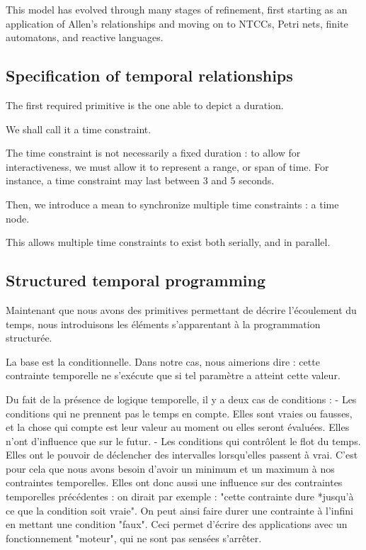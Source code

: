 \documentclass{sigchi}
\begin{document}
This model has evolved through many stages of refinement, first starting as an application of 
Allen's relationships and moving on to NTCCs, Petri nets, finite automatons, and reactive languages.

\subsection{Specification of temporal relationships}\label{sec.temporal}
The first required primitive is the one able to depict a duration.

We shall call it a time constraint.

The time constraint is not necessarily a fixed duration : to allow for interactiveness, 
we must allow it to represent a range, or span of time. For instance, a time constraint may last between 3 and 5 seconds.

Then, we introduce a mean to synchronize multiple time constraints : a time node. 

This allows multiple time constraints to exist both serially, and in parallel. 


\subsection{Structured temporal programming}
Maintenant que nous avons des primitives permettant de décrire l'écoulement du temps, nous introduisons les éléments s'apparentant à la programmation structurée.

La base est la conditionnelle. Dans notre cas, nous aimerions dire : cette contrainte temporelle ne s'exécute que si tel paramètre a atteint cette valeur.

Du fait de la présence de logique temporelle, il y a deux cas de conditions : 
- Les conditions qui ne prennent pas le temps en compte. Elles sont vraies ou fausses, et la chose qui compte est leur valeur au moment ou elles seront évaluées. Elles n'ont d'influence que sur le futur.
- Les conditions qui contrôlent le flot du temps. Elles ont le pouvoir de déclencher des intervalles lorsqu'elles passent à vrai. C'est pour cela que nous avons besoin d'avoir un minimum et un maximum à nos contraintes temporelles. Elles ont donc aussi une influence sur des contraintes temporelles précédentes : on dirait par exemple : "cette contrainte dure *jusqu'à ce que la condition soit vraie". On peut ainsi faire durer une contrainte à l'infini en mettant une condition "faux". Ceci permet d'écrire des applications avec un fonctionnement "moteur", qui ne sont pas sensées s'arrêter.
\end{document}
